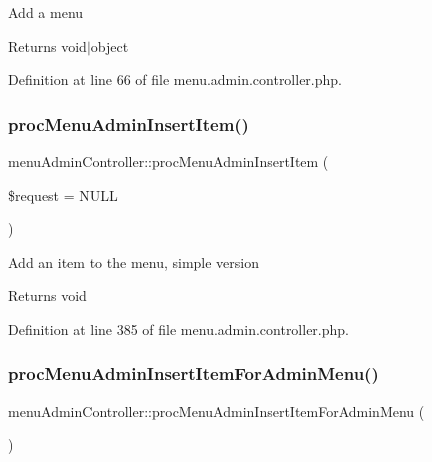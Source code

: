 Add a menu \begin{DoxyReturn}{Returns}
void$\vert$object 
\end{DoxyReturn}


Definition at line 66 of file menu.\+admin.\+controller.\+php.

\mbox{\label{classmenuAdminController_a34064cdce4df5a16faf19ada16751afe}} 
\subsubsection{\texorpdfstring{proc\+Menu\+Admin\+Insert\+Item()}{procMenuAdminInsertItem()}}
{\footnotesize\ttfamily menu\+Admin\+Controller\+::proc\+Menu\+Admin\+Insert\+Item (\begin{DoxyParamCaption}\item[{}]{\$request = {\ttfamily NULL} }\end{DoxyParamCaption})}

Add an item to the menu, simple version \begin{DoxyReturn}{Returns}
void 
\end{DoxyReturn}


Definition at line 385 of file menu.\+admin.\+controller.\+php.

\mbox{\label{classmenuAdminController_a788f347d7232e73062a39785960a4f14}} 
\subsubsection{\texorpdfstring{proc\+Menu\+Admin\+Insert\+Item\+For\+Admin\+Menu()}{procMenuAdminInsertItemForAdminMenu()}}
{\footnotesize\ttfamily menu\+Admin\+Controller\+::proc\+Menu\+Admin\+Insert\+Item\+For\+Admin\+Menu (\begin{DoxyParamCaption}{ }\end{DoxyParamCaption})}

